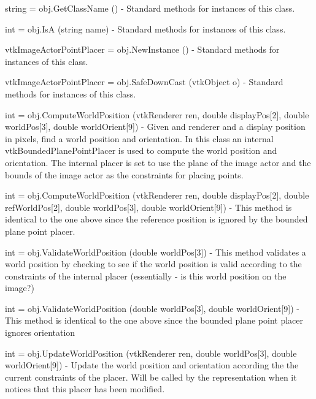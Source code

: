 \begin{DoxyItemize}
\item {\ttfamily string = obj.\-Get\-Class\-Name ()} -\/ Standard methods for instances of this class.  
\item {\ttfamily int = obj.\-Is\-A (string name)} -\/ Standard methods for instances of this class.  
\item {\ttfamily vtk\-Image\-Actor\-Point\-Placer = obj.\-New\-Instance ()} -\/ Standard methods for instances of this class.  
\item {\ttfamily vtk\-Image\-Actor\-Point\-Placer = obj.\-Safe\-Down\-Cast (vtk\-Object o)} -\/ Standard methods for instances of this class.  
\item {\ttfamily int = obj.\-Compute\-World\-Position (vtk\-Renderer ren, double display\-Pos\mbox{[}2\mbox{]}, double world\-Pos\mbox{[}3\mbox{]}, double world\-Orient\mbox{[}9\mbox{]})} -\/ Given and renderer and a display position in pixels, find a world position and orientation. In this class an internal vtk\-Bounded\-Plane\-Point\-Placer is used to compute the world position and orientation. The internal placer is set to use the plane of the image actor and the bounds of the image actor as the constraints for placing points.  
\item {\ttfamily int = obj.\-Compute\-World\-Position (vtk\-Renderer ren, double display\-Pos\mbox{[}2\mbox{]}, double ref\-World\-Pos\mbox{[}2\mbox{]}, double world\-Pos\mbox{[}3\mbox{]}, double world\-Orient\mbox{[}9\mbox{]})} -\/ This method is identical to the one above since the reference position is ignored by the bounded plane point placer.  
\item {\ttfamily int = obj.\-Validate\-World\-Position (double world\-Pos\mbox{[}3\mbox{]})} -\/ This method validates a world position by checking to see if the world position is valid according to the constraints of the internal placer (essentially -\/ is this world position on the image?)  
\item {\ttfamily int = obj.\-Validate\-World\-Position (double world\-Pos\mbox{[}3\mbox{]}, double world\-Orient\mbox{[}9\mbox{]})} -\/ This method is identical to the one above since the bounded plane point placer ignores orientation  
\item {\ttfamily int = obj.\-Update\-World\-Position (vtk\-Renderer ren, double world\-Pos\mbox{[}3\mbox{]}, double world\-Orient\mbox{[}9\mbox{]})} -\/ Update the world position and orientation according the the current constraints of the placer. Will be called by the representation when it notices that this placer has been modified.  

\end{DoxyItemize}

